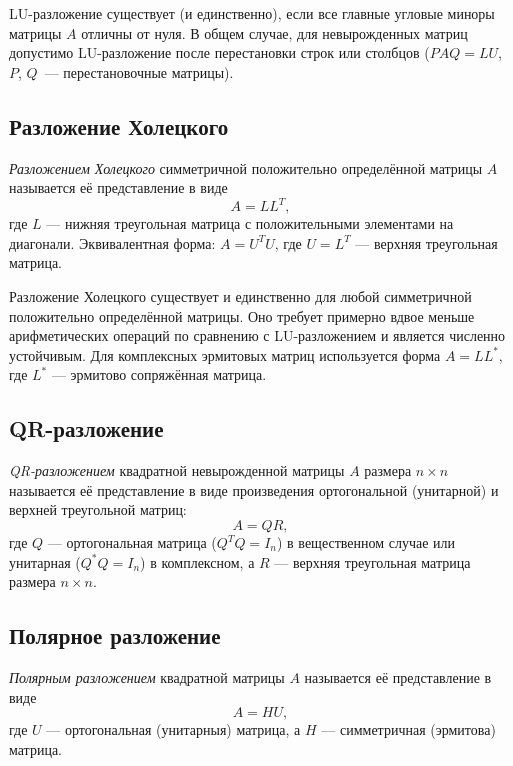 \documentclass[10pt]{article}
\begin{document}
\begin{remark}
    LU-разложение существует (и единственно), если все главные угловые миноры матрицы $A$ отличны от нуля. В общем случае, для невырожденных матриц допустимо LU-разложение после перестановки строк или столбцов ($PAQ = LU$, $P$, $Q$~--- перестановочные матрицы).
\end{remark}

\subsection{Разложение Холецкого}
\begin{definition}
    \textit{Разложением Холецкого} симметричной положительно определённой матрицы $A$ называется её представление в виде
    \[
    A = LL^T,
    \]
    где $L$ — нижняя треугольная матрица с положительными элементами на диагонали. Эквивалентная форма: $A = U^TU$, где $U = L^T$ — верхняя треугольная матрица.
\end{definition}

\begin{remark}
    Разложение Холецкого существует и единственно для любой симметричной положительно определённой матрицы. Оно требует примерно вдвое меньше арифметических операций по сравнению с LU-разложением и является численно устойчивым. Для комплексных эрмитовых матриц используется форма $A = LL^*$, где $L^*$ — эрмитово сопряжённая матрица.
\end{remark}

\subsection{QR-разложение}
\begin{definition}
    \textit{QR-разложением} квадратной невырожденной матрицы $A$ размера $n\times n$ называется её представление в виде произведения ортогональной (унитарной) и верхней треугольной матриц:
    \[
    A = QR,
    \]
    где $Q$ — ортогональная матрица ($Q^T Q = I_n$) в вещественном случае или унитарная ($Q^* Q = I_n$) в комплексном, а $R$ — верхняя треугольная матрица размера $n\times n$.
\end{definition}

\subsection{Полярное разложение}
\begin{definition}
    \textit{Полярным разложением} квадратной матрицы $A$ называется её представление в виде
    \[
    A = HU,
    \]
    где $U$ — ортогональная (унитарныя) матрица, а $H$ — симметричная (эрмитова) матрица.
\end{definition}
\end{document}
